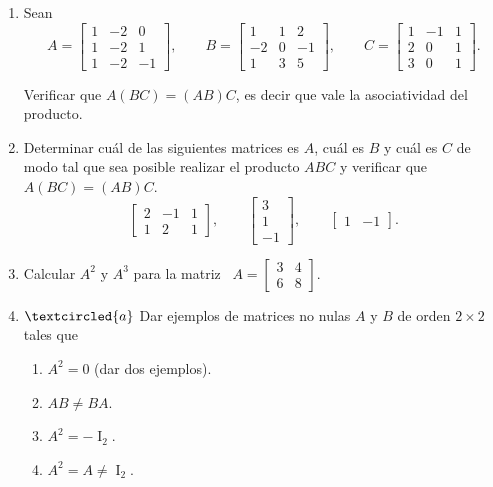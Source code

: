 \documentclass[12pt]{amsart}
\begin{document}
\begin{enumerate}[topsep=6pt,itemsep=6pt]


\item\label{ej} Sean
$$
A= \begin{bmatrix} 1&-2&0\\ 1&-2&1\\ 1&-2&-1\end{bmatrix},\quad
\quad B= \begin{bmatrix}1&1&2\\ -2&0&-1\\ 1&3&5 \end{bmatrix},
\quad\quad C=\begin{bmatrix}1&-1&1\\ 2&0&1\\ 3&0&1 \end{bmatrix}.
$$

Verificar que $A(BC)=(AB)C$, es decir que vale la asociatividad del producto.


\item\label{ej2} Determinar cu\'al de las siguientes matrices es $A$, cu\'al es $B$ y cu\'al es $C$ de modo tal que sea posible realizar el producto $ABC$ y verificar que $A(BC)=(AB)C$.
\begin{equation*}
\begin{bmatrix} 2 & -1 & 1 \\ 1 & 2 &
1\end{bmatrix},\qquad
\begin{bmatrix} 3 \\ 1 \\ -1\end{bmatrix}, \qquad
\begin{bmatrix} 1 & -1 \end{bmatrix}.
\end{equation*}


\item Calcular $A^2$ y $A^3$ para la matriz \
$
A=\begin{bmatrix}
3 & 4\\ 6 & 8
\end{bmatrix}.
$


\item\label{ejemplos 2x2} $\textcircled{a}$ Dar ejemplos de matrices no nulas $A$ y $B$ de orden $2\times2$ tales que
\begin{multicols}{2}
\begin{enumerate}[topsep=5pt,itemsep=5pt]
 \item $A^2=0$ (dar dos ejemplos).
 \item $AB\neq BA$.
 \item $A^2=-\operatorname{I}_2$.
 \item $A^2=A\neq\operatorname{I}_2$.
\end{enumerate}
\end{multicols}



\end{enumerate}
\end{document}
